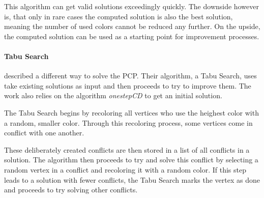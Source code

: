\documentclass[paper=a4,fontsize=12pt]{scrartcl}
\begin{document}
This algorithm can get valid solutions exceedingly quickly. The downside however is, that only in rare cases the computed solution is also the best solution, meaning the number of used colors cannot be reduced any further. On the upside, the computed solution can be used as a starting point for improvement processes.

 
\paragraph{Tabu Search}{
\citet*{Noronha2006} described a different way to solve the PCP. Their algorithm, a Tabu Search, uses take existing solutions as input and then proceeds to try to improve them. The work also relies on the algorithm \emph{onestepCD} to get an initial solution.


The Tabu Search begins by recoloring all vertices who use the heighest color with a random, smaller color. Through this recoloring process, some vertices come in conflict with one another. 


These deliberately created conflicts are then stored in a list of all conflicts in a solution. The algorithm then proceeds to try and solve this conflict by selecting a random vertex in a conflict and recoloring it with a random color. If this step leads to a solution with fewer conflicts, the Tabu Search marks the vertex as done and proceeds to try solving other conflicts.


}
\end{document}
